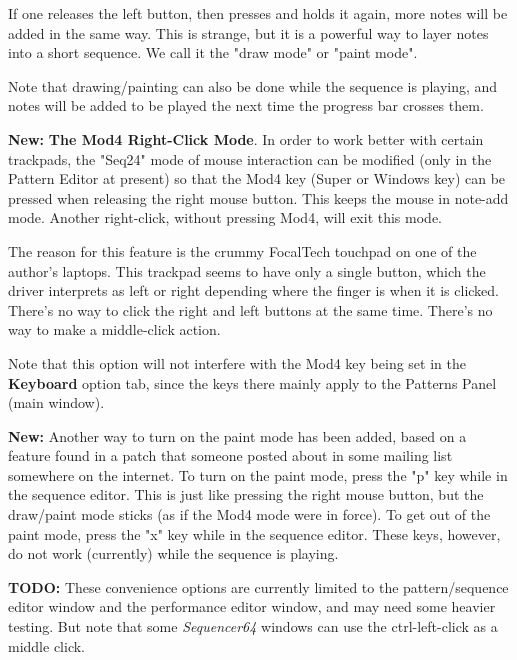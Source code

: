    If one releases the left button, then presses and holds it again,
   more notes will be added in the same way.
   This is strange, but it is a powerful way to layer notes into a short
   sequence.
   We call it the   "draw mode" or
     "paint mode".

   Note that drawing/painting can also be done while the sequence is playing,
   and notes will be added to be played the next time the progress bar crosses
   them.
   
   \textbf{New:}
   \label{new_mod4_mode}
   \textbf{The Mod4 Right-Click Mode}.
   In order to work better with certain trackpads, the
   "Seq24" mode of mouse interaction can be modified (only in the
   Pattern Editor at present) so that the Mod4 key (Super or Windows key)
   can be pressed when releasing the right mouse button.
   This keeps the mouse in note-add mode.
   Another right-click, without pressing Mod4, will exit this mode.

   The reason for this feature is the crummy FocalTech touchpad on one of
   the author's laptops.  This trackpad seems to have only a single button,
   which the driver interprets as left or right depending where the finger
   is when it is clicked.  There's no way to click the right and left
   buttons at the same time.  There's no way to make a middle-click action.

   Note that this option will not interfere with the Mod4 key being set
   in the \textbf{Keyboard} option tab, since the keys there mainly apply to
   the Patterns Panel (main window).


   \textbf{New:}
   Another way to turn on the paint mode has been added, based on a feature
   found in a patch that someone posted about in some mailing list somewhere on
   the internet.
   To turn on the paint mode, press the
   "p" key while in the sequence editor.
   This is just like pressing the right mouse button, but the draw/paint mode
   sticks (as if the Mod4 mode were in force).
   To get out of the paint mode, press the
   "x" key while in the sequence editor.
   These keys, however, do not work (currently) while the sequence is playing.

   \textbf{TODO:} These convenience options are currently limited to the
   pattern/sequence editor window and the performance editor window, and may
   need some heavier testing.  But note that some \textsl{Sequencer64} windows
   can use the ctrl-left-click as a middle click. 
 
